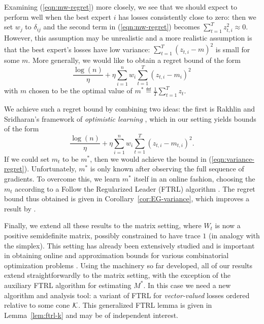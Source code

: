 \documentclass[paper_icml.tex]{subfiles}
\begin{document}

Examining (\ref{eqn:mw-regret}) more closely, we see that we should expect 
to perform well when the best expert $i$ has losses consistently close to zero: 
then we set $w_j$ to $\delta_{ij}$ and the second term in (\ref{eqn:mw-regret}) 
becomes $\sum_{t=1}^T z_{t,i}^2 \approx 0$. However, this assumption may be 
unrealistic and a more realistic assumption is that the best expert's losses 
have low variance: $\sum_{t=1}^T (z_{t,i} - m)^2$ is small for some $m$. More 
generally, we would like to obtain a regret bound of the form
\begin{equation}
\label{eqn:variance-regret}
\frac{\log(n)}{\eta} + \eta \sum_{i=1}^n w_i \sum_{t=1}^T (z_{t,i}-m_i)^2
\end{equation}
with $m$ chosen to be the optimal value of 
$m^* \eqdef \frac{1}{T} \sum_{t=1}^T z_t$.

We achieve such a regret bound by combining two ideas: the first is 
Rakhlin and Sridharan's framework of \emph{optimistic learning} 
\cite{rakhlin2012}, which in our setting yields bounds of the form 
\begin{equation}
\label{eqn:optimistic-regret}
\frac{\log(n)}{\eta} + \eta \sum_{i=1}^n w_i \sum_{t=1}^T (z_{t,i} - m_{t,i})^2.
\end{equation}
If we could set $m_t$ to be $m^*$, then we would achieve the bound in 
(\ref{eqn:variance-regret}). Unfortunately, $m^*$ is only known after observing 
the full sequence of gradients. To overcome this, we learn $m^*$ itself in an 
online fashion, choosing the $m_t$ according to a Follow the Regularized Leader 
(FTRL) algorithm \cite{hazan2011ftrl}. The regret bound thus obtained is given in 
Corollary~\ref{cor:EG-variance}, which improves a result by 
\cite{hazan2010variation}.

Finally, we extend all these results to the matrix setting, where $W_t$ is now 
a positive semidefinite matrix, possibly constrained to have trace $1$ 
(in analogy with the simplex). This setting has already been extensively studied 
\cite{tsuda2005matrix, arora2007combinatorial} and is important in 
obtaining online and approximation bounds for various combinatorial optimization 
problems \cite{arora2007combinatorial, hazan2012near}. Using the machinery so 
far developed, all of our results extend straightforwardly to the matrix setting, 
with the exception of the auxiliary FTRL algorithm for estimating $M^*$. In this 
case we need a new algorithm and analysis tool: a variant of FTRL for 
\emph{vector-valued} losses ordered relative to some cone $\mathcal{K}$. This generalized 
FTRL lemma is given in Lemma~\ref{lem:ftrl-k} and may be of independent interest.
\end{document}
